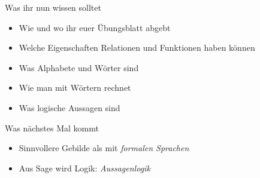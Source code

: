 \begin{frame}	
	\begin{block}{Was ihr nun wissen solltet}
		\begin{itemize}
			\item Wie und wo ihr euer Übungsblatt abgebt
			\item Welche Eigenschaften Relationen und Funktionen haben können
			\item Was Alphabete und Wörter sind
			\item Wie man mit Wörtern rechnet
			\item Was logische Aussagen sind
		\end{itemize}
	\end{block}
	
	\begin{block}{Was nächstes Mal kommt}
		\begin{itemize}
			\item Sinnvollere Gebilde als  mit \emph{formalen Sprachen}
			\item Aus Sage wird Logik: \emph{Aussagenlogik}
		\end{itemize}
	\end{block}
\end{frame}

\slideThanks

